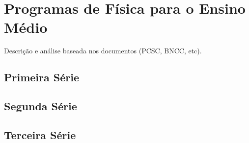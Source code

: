 \chapter{Programas de Física para o Ensino Médio}
\label{cap: prgFisica}
Descrição e análise baseada nos documentos (PCSC, BNCC, etc).
\section{Primeira Série}
\section{Segunda Série}
\section{Terceira Série}
